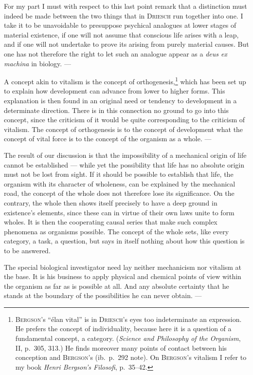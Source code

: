 \documentclass[12pt]{book}
\begin{document}
For my part I must with respect to this last point remark that a distinction must
indeed be made between the two things that in \textsc{Driesch} run together into one. I
take it to be unavoidable to presuppose psychical analogues at lower stages of material
existence, if one will not assume that conscious life arises with a leap, and if one
will not undertake to prove its arising from purely material causes. But one has not
therefore the right to let such an analogue appear as a \textit{deus ex machina} in
biology. ---

A concept akin to vitalism is the concept of orthogenesis,\footnote{\textsc{Bergson}'s
``élan vital'' is in \textsc{Driesch}'s eyes too indeterminate an expression. He
prefers the concept of individuality, because here it is a question of a fundamental
concept, a category. (\textit{Science and Philosophy of the Organism}, II, p.\ 305,
313.) He finds moreover many points of contact between his conception and
\textsc{Bergson}'s (ib.\ p.\ 292 note). On \textsc{Bergson}'s vitalism I refer to my
book \textit{Henri Bergson's Filosofi}, p.\ 35--42.} which has been set up to explain
how development can advance from lower to higher forms. This explanation is then found
in an original need or tendency to development in a determinate direction. There is in
this connection no ground to go into this concept, since the criticism of it would be
quite corresponding to the criticism of vitalism. The concept of orthogenesis is to the
concept of development what the concept of vital force is to the concept of the
organism as a whole. ---

The result of our discussion is that the impossibility of a mechanical origin of life
cannot be established --- while yet the possibility that life has no absolute origin
must not be lost from sight. If it should be possible to establish that life, the
organism with its character of wholeness, can be explained by the mechanical road, the
concept of the whole does not therefore lose its significance. On the contrary, the
whole then shows itself precisely to have a deep ground in existence's elements, since
these can in virtue of their own laws unite to form wholes. It is then the cooperating
causal series that make such complex phenomena as organisms possible. The concept of
the whole sets, like every category, a task, a question, but says in itself nothing
about how this question is to be answered.

The special biological investigator need lay neither mechanicism nor vitalism at the
base. It is his business to apply physical and chemical points of view within the
organism as far as is possible at all. And any absolute certainty that he stands at the
boundary of the possibilities he can never obtain. ---
\end{document}

